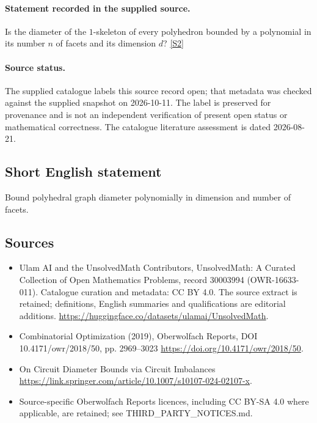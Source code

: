 \documentclass[11pt]{article}
\begin{document}
\paragraph{Statement recorded in the supplied source.}
Is the diameter of the $1$-skeleton of every polyhedron bounded by a polynomial in its number $n$ of facets and its dimension $d$? \href{https://doi.org/10.4171/owr/2018/50}{[S2]}
\paragraph{Source status.}
The supplied catalogue labels this source record open; that metadata was checked against the supplied snapshot on 2026-10-11. The label is preserved for provenance and is not an independent verification of present open status or mathematical correctness. The catalogue literature assessment is dated 2026-08-21.
\subsection{Short English statement}
Bound polyhedral graph diameter polynomially in dimension and number of facets.
\subsection{Sources}
\begin{itemize}
\item[S1] Ulam AI and the UnsolvedMath Contributors, UnsolvedMath: A Curated Collection of Open Mathematics Problems, record 30003994 (OWR-16633-011). Catalogue curation and metadata: CC BY 4.0. The source extract is retained; definitions, English summaries and qualifications are editorial additions.
\url{https://huggingface.co/datasets/ulamai/UnsolvedMath}.
\item[S2] Combinatorial Optimization (2019), Oberwolfach Reports, DOI 10.4171/owr/2018/50, pp. 2969--3023
\url{https://doi.org/10.4171/owr/2018/50}.
\item[S3] On Circuit Diameter Bounds via Circuit Imbalances
\url{https://link.springer.com/article/10.1007/s10107-024-02107-x}.
\item Source-specific Oberwolfach Reports licences, including CC BY-SA 4.0 where applicable, are retained; see THIRD\_PARTY\_NOTICES.md.
\end{itemize}
\end{document}
